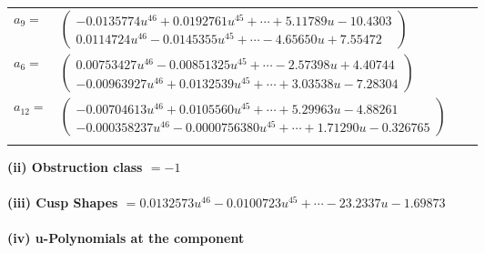 \documentclass[1p]{elsarticle_modified}
\theoremstyle{definition}
\begin{document}
\begin{tabular}{m{7pt} m{180pt} m{7pt} m{180pt} }
\flushright $a_{9}=$&$\begin{pmatrix}-0.0135774 u^{46}+0.0192761 u^{45}+\cdots+5.11789 u-10.4303\\0.0114724 u^{46}-0.0145355 u^{45}+\cdots-4.65650 u+7.55472\end{pmatrix}$ \\
\flushright $a_{6}=$&$\begin{pmatrix}0.00753427 u^{46}-0.00851325 u^{45}+\cdots-2.57398 u+4.40744\\-0.00963927 u^{46}+0.0132539 u^{45}+\cdots+3.03538 u-7.28304\end{pmatrix}$ \\
\flushright $a_{12}=$&$\begin{pmatrix}-0.00704613 u^{46}+0.0105560 u^{45}+\cdots+5.29963 u-4.88261\\-0.000358237 u^{46}-0.0000756380 u^{45}+\cdots+1.71290 u-0.326765\end{pmatrix}$\\&\end{tabular}
\flushleft \textbf{(ii) Obstruction class $= -1$}\\~\\
\flushleft \textbf{(iii) Cusp Shapes $= 0.0132573 u^{46}-0.0100723 u^{45}+\cdots-23.2337 u-1.69873$}\\~\\
\newpage\renewcommand{\arraystretch}{1}
\flushleft \textbf{(iv) u-Polynomials at the component}\newline \\
\end{document}
